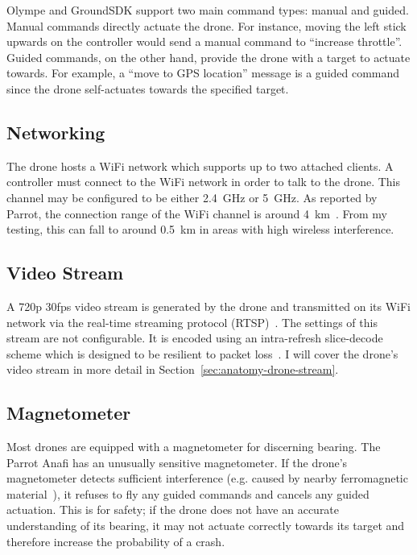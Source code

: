 Olympe and GroundSDK support two main command types: manual and guided. Manual commands directly actuate the drone. For instance, moving the left stick upwards on the controller would send a manual command to ``increase throttle''. Guided commands, on the other hand, provide the drone with a target to actuate towards. For example, a ``move to GPS location'' message is a guided command since the drone self-actuates towards the specified target.

\subsection{Networking}
The drone hosts a WiFi network which supports up to two attached clients. A controller must connect to the WiFi network in order to talk to the drone. This channel may be configured to be either 2.4~GHz or 5~GHz. As reported by Parrot, the connection range of the WiFi channel is around 4~km~\cite{ParrotAnafi}. From my testing, this can fall to around 0.5~km in areas with high wireless interference.

\subsection{Video Stream}
A 720p 30fps video stream is generated by the drone and transmitted on its WiFi network via the real-time streaming protocol (RTSP)~\cite{RTSP}. The settings of this stream are not configurable. It is encoded using an intra-refresh slice-decode scheme which is designed to be resilient to packet loss~\cite{Cloudinary}. I will cover the drone's video stream in more detail in Section~\ref{sec:anatomy-drone-stream}.

\subsection{Magnetometer}
Most drones are equipped with a magnetometer for discerning bearing. The Parrot Anafi has an unusually sensitive magnetometer. If the drone's magnetometer detects sufficient interference (e.g. caused by nearby ferromagnetic material~\cite{Ardupilot}), it refuses to fly any guided commands and cancels any guided actuation. This is for safety; if the drone does not have an accurate understanding of its bearing, it may not actuate correctly towards its target and therefore increase the probability of a crash.

